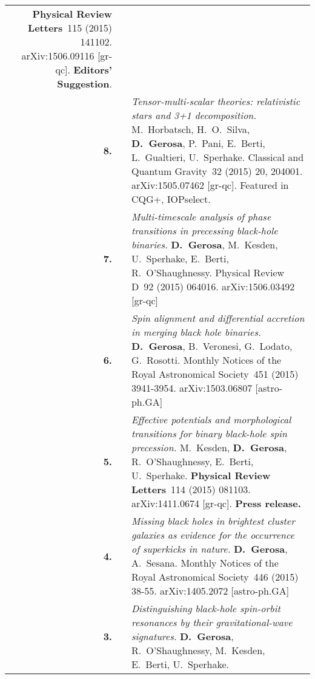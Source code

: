 \documentclass[11pt,a4paper,sans]{moderncv}   %
\newcommand{\mnras}{Monthly Notices of the Royal Astronomical Society}
\newcommand{\prd}{Physical Review D}
\newcommand{\prl}{Physical Review Letters}
\newcommand{\cqg}{Classical and Quantum Gravity}
\begin{document}
{\begin{longtable}{rp{0.3cm}p{15.8cm}}
\textbf{\prl}~115 (2015) 141102.
arXiv:1506.09116 [gr-qc].  \textbf{Editors' Suggestion}.
\vspace{0.05cm}\\
\textbf{8.} & & \textit{Tensor-multi-scalar theories: relativistic stars and 3+1 decomposition.} 
\newline{}
M.~Horbatsch, H.~O.~Silva, \textbf{D.~Gerosa}, P.~Pani,  E.~Berti, L.~Gualtieri, U.~Sperhake.
  \newline{}
\cqg~32 (2015) 20, 204001.
arXiv:1505.07462 [gr-qc]. Featured in CQG+, IOPselect.\!\vspace{0.05cm}\\
\textbf{7.} & & \textit{Multi-timescale analysis of phase transitions in precessing black-hole binaries.} 
\newline{}
\textbf{D.~Gerosa}, M.~Kesden, U.~Sperhake, E.~Berti, R.~O’Shaughnessy.
  \newline{}
\prd~92 (2015) 064016. arXiv:1506.03492 [gr-qc]
\vspace{0.05cm}\\
\textbf{6.} & & \textit{Spin alignment and differential accretion in merging black hole binaries.}
\newline{}
\textbf{D.~Gerosa}, B.~Veronesi, G.~Lodato, G.~Rosotti. 
\newline{}
\mnras~451 (2015) 3941-3954. arXiv:1503.06807 [astro-ph.GA]
\vspace{0.05cm}\\
\textbf{5.} & & \textit{Effective potentials and morphological transitions for binary black-hole spin precession.}
\newline{}
M.~Kesden, \textbf{D.~Gerosa}, R.~O'Shaughnessy, E.~Berti, U.~Sperhake.
\newline{}
\textbf{\prl}~114 (2015) 081103. arXiv:1411.0674 [gr-qc]. \textbf{Press release.}
\vspace{0.05cm}\\
\textbf{4.} & & \textit{Missing black holes in brightest cluster galaxies as evidence for the occurrence of superkicks in nature.}
\newline{}
\textbf{D.~Gerosa}, A.~Sesana.
\newline{}
\mnras~446 (2015) 38-55. arXiv:1405.2072 [astro-ph.GA]
\vspace{0.05cm}\\
\textbf{3.} & & \textit{Distinguishing black-hole spin-orbit resonances by their gravitational-wave signatures.}
\newline{}
\textbf{D.~Gerosa}, R.~O'Shaughnessy, M.~Kesden, E.~Berti, U.~Sperhake. 

\end{longtable}}
\end{document}
